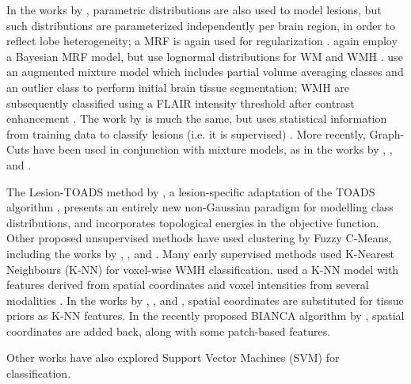 In the works by \citeauthor{Harmouche2006}, parametric distributions are also used to model lesions, but such distributions are parameterized independently per brain region, in order to reflect lobe heterogeneity; a MRF is again used for regularization \cite{Harmouche2006,Harmouche2015}.
\citeauthor{Schwarz2009} again employ a Bayesian MRF model, but use lognormal distributions for WM and WMH \cite{Schwarz2009}.
\citeauthor{Souplet2008} use an augmented mixture model which includes partial volume averaging classes and an outlier class to perform initial brain tissue segmentation; WMH are subsequently classified using a FLAIR intensity threshold after contrast enhancement \cite{Souplet2008}. 
The work by \citeauthor{Herskovits2008} is much the same, but uses statistical information from training data to classify lesions (i.e. it is supervised) \cite{Herskovits2008}.
More recently, Graph-Cuts have been used in conjunction with mixture models, as in the works by \citeauthor{Garcia-Lorenzo2009} \cite{Garcia-Lorenzo2009}, \citeauthor{Tomas-Fernandez2015} \cite{Tomas-Fernandez2015}, and \citeauthor{Strumia2016} \cite{Strumia2016}.
\par
The Lesion-TOADS method by \citeauthor{Shiee2010} \cite{Shiee2010}, a lesion-specific adaptation of the TOADS algorithm \cite{Bazin2008}, presents an entirely new non-Gaussian paradigm for modelling class distributions, and incorporates topological energies in the objective function.
Other proposed unsupervised methods have used clustering by Fuzzy C-Means, including the works by \citeauthor{Admiraal-Behloul2005} \cite{Admiraal-Behloul2005}, \citeauthor{Gibson2010} \cite{Gibson2010}, and \citeauthor{Valverde2016} \cite{Valverde2016}.
Many early supervised methods used K-Nearest Neighbours (K-NN) for voxel-wise WMH classification.
\citeauthor{Anbeek2005} used a K-NN model with features derived from spatial coordinates and voxel intensities from several modalities \cite{Anbeek2004,Anbeek2005}.
In the works by \citeauthor{Wu2006} \cite{Wu2006}, \citeauthor{Steenwijk2013} \cite{Steenwijk2013}, and \citeauthor{Fartaria2015} \cite{Fartaria2015}, spatial coordinates are substituted for tissue priors as K-NN features.
In the recently proposed BIANCA algorithm by \citeauthor{Griffanti2016} \cite{Griffanti2016}, spatial coordinates are added back, along with some patch-based features.
\par
Other works have also explored Support Vector Machines (SVM) for classification.
